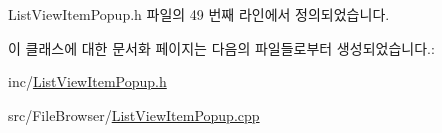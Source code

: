 List\+View\+Item\+Popup.\+h 파일의 49 번째 라인에서 정의되었습니다.



이 클래스에 대한 문서화 페이지는 다음의 파일들로부터 생성되었습니다.\+:\begin{DoxyCompactItemize}
\item 
inc/\hyperlink{_list_view_item_popup_8h}{List\+View\+Item\+Popup.\+h}\item 
src/\+File\+Browser/\hyperlink{_list_view_item_popup_8cpp}{List\+View\+Item\+Popup.\+cpp}\end{DoxyCompactItemize}
